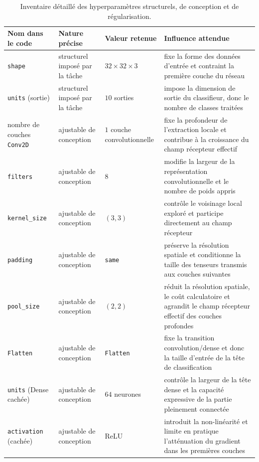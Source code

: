 \begin{table}[t]
\centering
\caption{Inventaire d\'etaill\'e des hyperparam\`etres structurels, de conception et de r\'egularisation.}
\label{tab:section5_structure_inventory}
\scriptsize
\begin{tabular}{|p{2.6cm}|p{3.5cm}|p{3.1cm}|p{6.9cm}|}
\hline
Nom dans le code & Nature pr\'ecise & Valeur retenue & Influence attendue \\
\hline
\texttt{shape} & structurel impos\'e par la t\^ache & $32\times 32\times 3$ & fixe la forme des donn\'ees d'entr\'ee et contraint la premi\`ere couche du r\'eseau \\
\hline
\texttt{units} (sortie) & structurel impos\'e par la t\^ache & $10$ sorties & impose la dimension de sortie du classifieur, donc le nombre de classes trait\'ees \\
\hline
nombre de couches \texttt{Conv2D} & ajustable de conception & $1$ couche convolutionnelle & fixe la profondeur de l'extraction locale et contribue \`a la croissance du champ r\'ecepteur effectif \\
\hline
\texttt{filters} & ajustable de conception & $8$ & modifie la largeur de la repr\'esentation convolutionnelle et le nombre de poids appris \\
\hline
\texttt{kernel\_size} & ajustable de conception & $(3,3)$ & contr\^ole le voisinage local explor\'e et participe directement au champ r\'ecepteur \\
\hline
\texttt{padding} & ajustable de conception & \texttt{same} & pr\'eserve la r\'esolution spatiale et conditionne la taille des tenseurs transmis aux couches suivantes \\
\hline
\texttt{pool\_size} & ajustable de conception & $(2,2)$ & r\'eduit la r\'esolution spatiale, le co\^ut calculatoire et agrandit le champ r\'ecepteur effectif des couches profondes \\
\hline
\texttt{Flatten} & ajustable de conception & \texttt{Flatten} & fixe la transition convolution/dense et donc la taille d'entr\'ee de la t\^ete de classification \\
\hline
\texttt{units} (Dense cach\'ee) & ajustable de conception & $64$ neurones & contr\^ole la largeur de la t\^ete dense et la capacit\'e expressive de la partie pleinement connect\'ee \\
\hline
\texttt{activation} (cach\'ee) & ajustable de conception & ReLU & introduit la non-lin\'earit\'e et limite en pratique l'att\'enuation du gradient dans les premi\`eres couches \\

\end{tabular}
\end{table}
